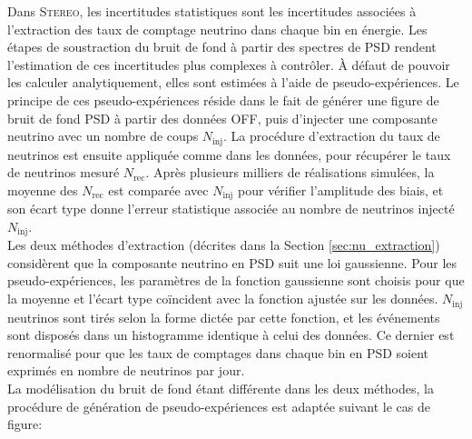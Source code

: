 Dans \textsc{Stereo}, les \og incertitudes statistiques \fg{} sont les incertitudes associées à l'extraction des taux de comptage neutrino dans chaque bin en énergie. Les étapes de soustraction du bruit de fond à partir des spectres de PSD rendent l'estimation de ces incertitudes plus complexes à contrôler. À défaut de pouvoir les calculer analytiquement, elles sont estimées à l'aide de pseudo-expériences. Le principe de ces pseudo-expériences réside dans le fait de générer une figure de bruit de fond PSD à partir des données OFF, puis d'injecter une composante neutrino avec un nombre de coups $N_\textrm{inj}$. La procédure d'extraction du taux de neutrinos est ensuite appliquée comme dans les données, pour récupérer le taux de neutrinos mesuré $N_\textrm{rec}$. Après plusieurs milliers de réalisations simulées, la moyenne des $N_\textrm{rec}$ est comparée avec $N_\textrm{inj}$ pour vérifier l'amplitude des biais, et son écart type donne l'erreur statistique associée au nombre de neutrinos injecté $N_\textrm{inj}$.\\

Les deux méthodes d'extraction (décrites dans la Section \ref{sec:nu_extraction}) considèrent que la composante neutrino en PSD suit une loi gaussienne. Pour les pseudo-expériences, les paramètres de la fonction gaussienne sont choisis pour que la moyenne et l'écart type coïncident avec la fonction ajustée sur les données. $N_\textrm{inj}$ neutrinos sont tirés selon la forme dictée par cette fonction, et les événements sont disposés dans un histogramme identique à celui des données. Ce dernier est renormalisé pour que les taux de comptages dans chaque bin en PSD soient exprimés en nombre de neutrinos par jour.\\

La modélisation du bruit de fond étant différente dans les deux méthodes, la procédure de génération de pseudo-expériences est adaptée suivant le cas de figure:\\

